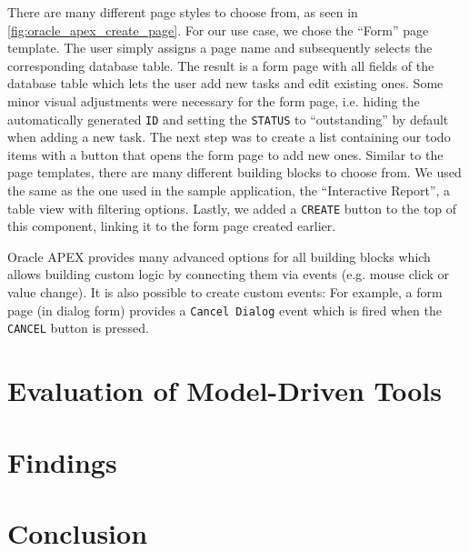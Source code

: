 \documentclass[runningheads]{llncs}
\begin{document}
There are many different page styles to choose from, as seen in \cref{fig:oracle_apex_create_page}. For our use case, we chose the “Form” page template. The user simply assigns a page name and subsequently selects the  corresponding database table. The result is a form page with all fields of the database table which lets the user add new tasks and edit existing ones. Some minor visual adjustments were necessary for the form page, i.e. hiding the automatically generated \texttt{ID} and setting the \texttt{STATUS} to “outstanding” by default when adding a new task. The next step was to create a list containing our todo items with a button that opens the form page to add new ones. Similar to the page templates, there are many different building blocks to choose from. We used the same as the one used in the sample application, the “Interactive Report”, a table view with filtering options. Lastly, we added a \texttt{CREATE} button to the top of this component, linking it to the form page created earlier.

Oracle APEX provides many advanced options for all building blocks which allows building custom logic by connecting them via events (e.g. mouse click or value change). It is also possible to create custom events: For example, a form page (in dialog form) provides a \texttt{Cancel Dialog} event which is fired when the \texttt{CANCEL} button is pressed.

\section{Evaluation of Model-Driven Tools}
\label{sec:evaluation_of_model_driven_tools}

\section{Findings}
\label{sec:findings}

\section{Conclusion}
\label{sec:conclusion}

\newpage
\printbibliography
\end{document}

